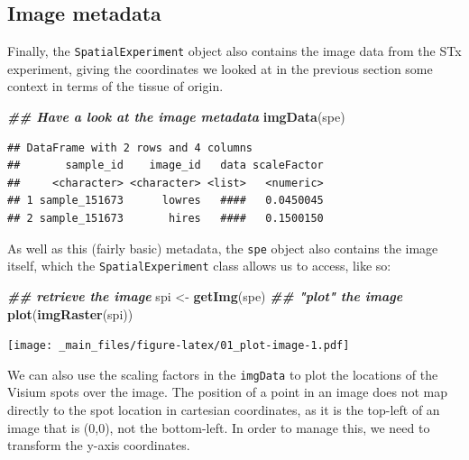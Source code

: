 \documentclass[
]{book}
\newenvironment{Shaded}{\begin{snugshade}}{\end{snugshade}}
\newcommand{\DocumentationTok}[1]{\textcolor[rgb]{0.56,0.35,0.01}{\textbf{\textit{#1}}}}
\newcommand{\FunctionTok}[1]{\textcolor[rgb]{0.13,0.29,0.53}{\textbf{#1}}}
\newcommand{\NormalTok}[1]{#1}
\newcommand{\OtherTok}[1]{\textcolor[rgb]{0.56,0.35,0.01}{#1}}
\begin{document}
\hypertarget{image-metadata}{%
\subsection{Image metadata}\label{image-metadata}}

Finally, the \texttt{SpatialExperiment} object also contains the image data from the STx experiment, giving the coordinates we looked at in the previous section some context in terms of the tissue of origin.

\begin{Shaded}
\begin{Highlighting}[]
\DocumentationTok{\#\# Have a look at the image metadata}
\FunctionTok{imgData}\NormalTok{(spe)}
\end{Highlighting}
\end{Shaded}

\begin{verbatim}
## DataFrame with 2 rows and 4 columns
##       sample_id    image_id   data scaleFactor
##     <character> <character> <list>   <numeric>
## 1 sample_151673      lowres   ####   0.0450045
## 2 sample_151673       hires   ####   0.1500150
\end{verbatim}

As well as this (fairly basic) metadata, the \texttt{spe} object also contains the image itself, which the \texttt{SpatialExperiment} class allows us to access, like so:

\begin{Shaded}
\begin{Highlighting}[]
\DocumentationTok{\#\# retrieve the image}
\NormalTok{spi }\OtherTok{\textless{}{-}} \FunctionTok{getImg}\NormalTok{(spe)}
\DocumentationTok{\#\# "plot" the image}
\FunctionTok{plot}\NormalTok{(}\FunctionTok{imgRaster}\NormalTok{(spi))}
\end{Highlighting}
\end{Shaded}

\texttt{[image: \_main\_files/figure-latex/01\_plot-image-1.pdf]}

We can also use the scaling factors in the \texttt{imgData} to plot the locations of the Visium spots over the image. The position of a point in an image does not map directly to the spot location in cartesian coordinates, as it is the top-left of an image that is (0,0), not the bottom-left. In order to manage this, we need to transform the y-axis coordinates.
\end{document}

